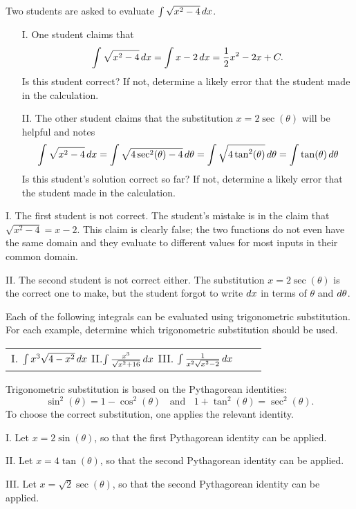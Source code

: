 \documentclass[noauthor]{ximera}
\begin{document}
\begin{problem}
Two students are asked to evaluate $\int \sqrt{x^2-4} \mathop{}\!d x$.

\begin{itemize}
\item[I.] One student claims that
\[
\int \sqrt{x^2-4} \mathop{}\!d x = \int x-2 \mathop{}\!d x = \frac{1}{2}x^2 - 2x + C.
\]
Is this student correct? If not, determine a likely error that the student made in the calculation.

\item[II.] The other student claims that the substitution $x = 2 \sec(\theta)$ will be helpful and notes
\[
\int \sqrt{x^2-4} \mathop{}\!d x =\int \sqrt{4 \sec^2(\theta)-4} \mathop{}\!d \theta = \int \sqrt{4 \tan^2(\theta)} \mathop{}\!d \theta =  \int \tan(\theta) \mathop{}\!d \theta
\]
Is this student's solution correct so far? If not, determine a likely error that the student made in the calculation.
\end{itemize}
\end{problem}

\begin{freeResponse}
I. The first student is not correct. The student's mistake is in the claim that $\sqrt{x^2-4}=x-2$. This claim is clearly false; the two functions do not even have the same domain and they evaluate to different values for most inputs in their common domain.

II. The second student is not correct either.  The substitution $x = 2\sec(\theta)$ is the correct one to make, but the student forgot to write $\mathop{}\!d x$ in terms of $\theta$ and $\mathop{}\!d \theta$.

\end{freeResponse}

\begin{problem}
Each of the following integrals can be evaluated using trigonometric substitution. For each example, determine which trigonometric substitution should be used.

\begin{center}
\begin{tabular}{lll}
I. $\int x^3 \sqrt{4-x^2} \mathop{}\!d x $ \hspace{.2in} II.$\int \frac{x^3}{\sqrt{x^2+16}} \mathop{}\!d x$ \hspace{.2in} III. $\int \frac{1}{x^2 \sqrt{x^2-2}} \mathop{}\!d x$
\end{tabular}
\end{center}
\end{problem}

\begin{freeResponse}
Trigonometric substitution is based on the Pythagorean identities:
$$
\sin^2(\theta)  = 1 - \cos^2(\theta) \;\; \mbox{ and } \;\;  1 + \tan^2(\theta) = \sec^2(\theta).
$$
To choose the correct substitution, one applies the relevant identity.

I. Let $x = 2 \sin(\theta)$, so that the first Pythagorean identity can be applied.

II. Let $x=4 \tan(\theta)$, so that the second Pythagorean identity can be applied.

III. Let $x=\sqrt{2}\sec(\theta)$, so that the second Pythagorean identity can be applied.
\end{freeResponse}
\end{document}
